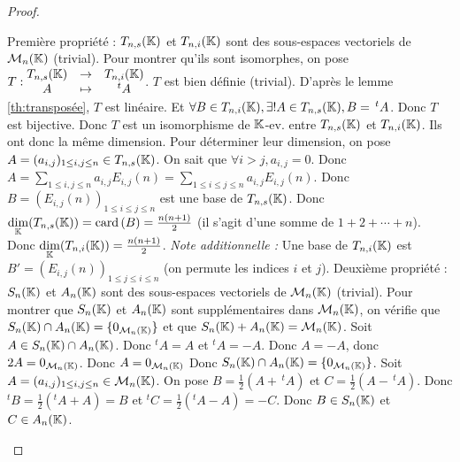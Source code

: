 \documentclass[12pt, a4paper]{report}
\begin{document}
\begin{proof}
    \begin{outline}
        \1 Première propriété :
            \2 $T_{n,s}(\mathbb{K})$ et $T_{n,i}(\mathbb{K})$ sont des sous-espaces vectoriels de $\mathcal M_n(\mathbb{K})$ (trivial).
            \2 Pour montrer qu'ils sont isomorphes, on pose $T: \begin{matrix} T_{n,s}(\mathbb{K}) &\to &T_{n,i}(\mathbb{K}) \\ A &\mapsto &^tA \end{matrix}$.
            \3 $T$ est bien définie (trivial).
            \3 D'après le lemme \ref{th:transposée}, $T$ est linéaire.
            \3 Et $\forall B \in T_{n,i}(\mathbb{K}), \exists ! A \in T_{n,s}(\mathbb{K}), B = \,^tA$. Donc $T$ est bijective.
            \2 Donc $T$ est un isomorphisme de $\mathbb{K}$-ev. entre $T_{n,s}(\mathbb{K})$ et $T_{n,i}(\mathbb{K})$.
            \2 Ils ont donc la même dimension.
            \2 Pour déterminer leur dimension, on pose $A = (a_{i,j})_{1 \le i,j \le n} \in T_{n,s}(\mathbb{K})$.
            \2 On sait que $\forall i > j, a_{i,j} = 0$.
            \2 Donc $A = \sum_{1 \le i,j \le n} a_{i,j} E_{i,j}(n) = \sum_{1 \le i \le j \le n} a_{i,j} E_{i,j}(n)$.
            \2 Donc $B = (E_{i,j}(n))_{1 \le i \le j \le n}$ est une base de $T_{n,s}(\mathbb{K})$.
            \2 Donc $\underset{\mathbb{K}}\dim(T_{n,s}(\mathbb{K})) = \mathrm{card}\left(B\right) = \frac{n(n+1)}{2}$ (il s'agit d'une somme de $1 + 2 + \cdots + n$).
            \2 Donc $\underset{\mathbb{K}}\dim(T_{n,i}(\mathbb{K})) = \frac{n(n+1)}{2}$.
            \2 \textit{Note additionnelle :} Une base de $T_{n,i}(\mathbb{K})$ est $B' = (E_{i,j}(n))_{1 \le j \le i \le n}$ (on permute les indices $i$ et $j$).
        \1 Deuxième propriété :
            \2 $S_n(\mathbb{K})$ et $A_n(\mathbb{K})$ sont des sous-espaces vectoriels de $\mathcal M_n(\mathbb{K})$ (trivial).
            \2 Pour montrer que $S_n(\mathbb{K})$ et $A_n(\mathbb{K})$ sont supplémentaires dans $\mathcal M_n(\mathbb{K})$, on vérifie que $S_n(\mathbb{K}) \cap A_n(\mathbb{K}) = \{0_{\mathcal M_n(\mathbb{K})}\}$ et que $S_n(\mathbb{K}) + A_n(\mathbb{K}) = \mathcal M_n(\mathbb{K})$.
            \3 Soit $A \in S_n(\mathbb{K}) \cap A_n(\mathbb{K})$. Donc $^tA = A$ et $^tA = -A$.
            \3 Donc $A = -A$, donc $2A = 0_{\mathcal M_n(\mathbb{K})}$.
            \3 Donc $A = 0_{\mathcal M_n(\mathbb{K})}$
            \3 Donc $S_n(\mathbb{K}) \cap A_n(\mathbb{K}) = \{0_{\mathcal M_n(\mathbb{K})}\}$.
            \3 Soit $A = (a_{i,j})_{1 \le i,j \le n} \in \mathcal M_n(\mathbb{K})$.
            \3 On pose $B = \frac{1}{2}(A + \,^tA)$ et $C = \frac{1}{2}(A - \,^tA)$.
            \3 Donc $^tB = \frac{1}{2}(^tA + A) = B$ et $^tC = \frac{1}{2}(^tA - A) = -C$.
            \3 Donc $B \in S_n(\mathbb{K})$ et $C \in A_n(\mathbb{K})$.

\end{outline}
\end{proof}
\end{document}
